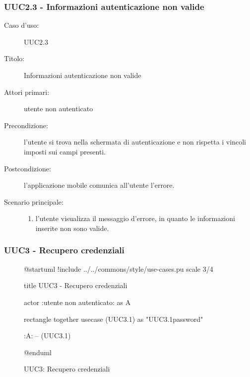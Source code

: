 \documentclass[casi-duso]{subfiles}
\begin{document}
\subsubsection{UUC2.3 - Informazioni autenticazione non valide}%
\label{subsub:UUC2.3utente}
\begin{description}
  \item[Caso d’uso:] UUC2.3
  \item[Titolo:] Informazioni autenticazione non valide
  \item[Attori primari:] utente non autenticato
  \item[Precondizione:] l'utente si trova nella schermata di autenticazione e non rispetta i vincoli imposti sui campi presenti.
  \item[Postcondizione:] l'applicazione mobile comunica all'utente l'errore.
  \item[Scenario principale:]
        \begin{enumerate}
          \item l'utente visualizza il messaggio d'errore, in quanto le informazioni inserite non sono valide.
        \end{enumerate}
\end{description}

\subsubsection{UUC3 - Recupero credenziali}%
\label{subsub:UUC3utente}

\begin{figure}[h!] 
  \centering 
  \begin{plantuml}
  @startuml
  !include ../../commons/style/use-cases.pu
  scale 3/4

  title UUC3 - Recupero credenziali

  actor :utente non autenticato: as A

  rectangle {
    together {
      usecase (UUC3.1) as "UUC3.1\nRecupero password" 
    }
  }

  :A: -- (UUC3.1)

  @enduml
  \end{plantuml} 
  \caption{UUC3: Recupero credenziali} 
  \label{fig:uuc3} 
\end{figure}
\end{document}
